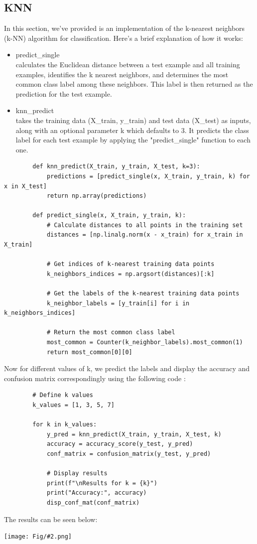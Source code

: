 \documentclass[]{article}
\newcommand{\pict}[2]{\begin{center}
		\texttt{[image: Fig/\#2.png]}
\end{center}}
\begin{document}
	\subsection{KNN}
	In this section, we’ve provided is an implementation of the k-nearest neighbors (k-NN) algorithm for classification. Here’s a brief explanation of how it works:
	\begin{itemize}
		\item predict\_single \\
		calculates the Euclidean distance between a test example and all training examples, identifies the k nearest neighbors, and determines the most common class label among these neighbors. This label is then returned as the prediction for the test example.
		\item knn\_predict \\
		takes the training data (X\_train, y\_train) and test data (X\_test) as inputs, along with an optional parameter k which defaults to 3. It predicts the class label for each test example by applying the "predict\_single" function to each one.
	\end{itemize}
	\begin{lstlisting}
		def knn_predict(X_train, y_train, X_test, k=3):
			predictions = [predict_single(x, X_train, y_train, k) for x in X_test]
			return np.array(predictions)
		
		def predict_single(x, X_train, y_train, k):
			# Calculate distances to all points in the training set
			distances = [np.linalg.norm(x - x_train) for x_train in X_train]
			
			# Get indices of k-nearest training data points
			k_neighbors_indices = np.argsort(distances)[:k]
			
			# Get the labels of the k-nearest training data points
			k_neighbor_labels = [y_train[i] for i in k_neighbors_indices]
			
			# Return the most common class label
			most_common = Counter(k_neighbor_labels).most_common(1)
			return most_common[0][0]
	\end{lstlisting}
	Now for different values of k, we predict the labels and display the accuracy and confusion matrix correspondingly using the following code :
	\begin{lstlisting}
		# Define k values
		k_values = [1, 3, 5, 7]
		
		for k in k_values:
			y_pred = knn_predict(X_train, y_train, X_test, k)
			accuracy = accuracy_score(y_test, y_pred)
			conf_matrix = confusion_matrix(y_test, y_pred)
			
			# Display results
			print(f"\nResults for k = {k}")
			print("Accuracy:", accuracy)
			disp_conf_mat(conf_matrix)
	\end{lstlisting}
	The results can be seen below:
	\pict{0.9}{F4}
	
\end{document}

